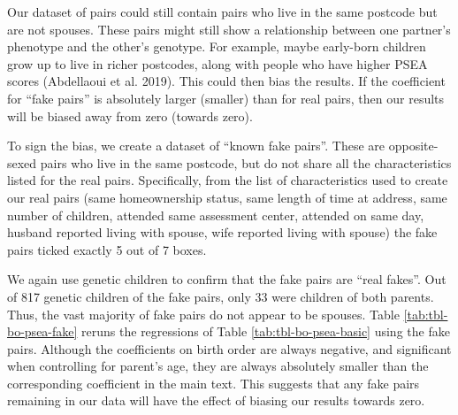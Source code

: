 \documentclass[
]{article}
\theoremstyle{definition}
\theoremstyle{definition}
\theoremstyle{definition}
\theoremstyle{definition}
\theoremstyle{remark}
\begin{document}
Our dataset of pairs could still contain pairs who live in the same
postcode but are not spouses. These pairs might still show a
relationship between one partner's phenotype and the other's genotype.
For example, maybe early-born children grow up to live in richer
postcodes, along with people who have higher PSEA scores
(Abdellaoui et al. 2019). This could then bias the results. If the
coefficient for ``fake pairs'' is absolutely larger (smaller) than for
real pairs, then our results will be biased away from zero (towards
zero).

To sign the bias, we create a dataset of ``known fake pairs''. These are
opposite-sexed pairs who live in the same postcode, but do not share all
the characteristics listed for the real pairs. Specifically, from the
list of characteristics used to create our real pairs (same
homeownership status, same length of time at address, same number of
children, attended same assessment center, attended on same day, husband
reported living with spouse, wife reported living with spouse) the fake
pairs ticked exactly 5 out of 7 boxes.

We again use genetic children to confirm that the fake pairs are ``real
fakes''. Out of 817 genetic children of the fake pairs, only
33 were children of both parents. Thus, the vast majority of
fake pairs do not appear to be spouses. Table
\ref{tab:tbl-bo-psea-fake} reruns the regressions of Table
\ref{tab:tbl-bo-psea-basic} using the fake pairs. Although the
coefficients on birth order are always negative, and significant
when controlling for parent's age, they are always absolutely smaller than the
corresponding coefficient in the main text. This suggests that
any fake pairs remaining in our data will have the effect of biasing our
results towards zero.

 
  \providecommand{\huxb}[2]{\arrayrulecolor[RGB]{#1}\global\arrayrulewidth=#2pt}
  \providecommand{\huxvb}[2]{\color[RGB]{#1}\vrule width #2pt}
  \providecommand{\huxtpad}[1]{\rule{0pt}{#1}}
  \providecommand{\huxbpad}[1]{\rule[-#1]{0pt}{#1}}
\end{document}
